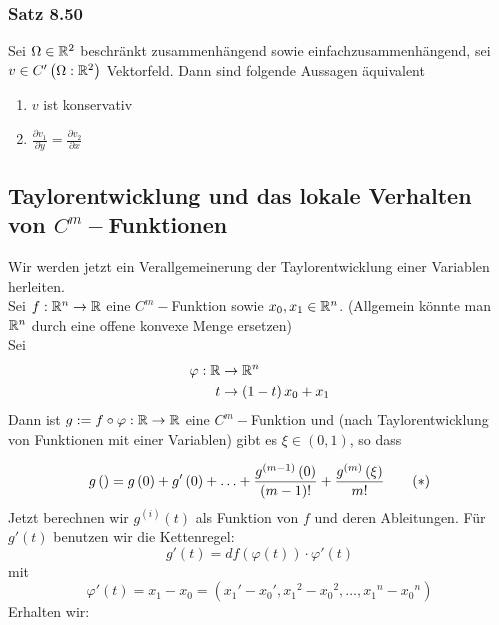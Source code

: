\subsubsection*{Satz 8.50}
Sei $\Omega\in\mathbb{R}^2$ beschränkt zusammenhängend sowie einfachzusammenhängend, sei $v\in C'\left( \Omega:\mathbb{R}^2\right)$ Vektorfeld. Dann sind folgende Aussagen äquivalent
\begin{enumerate}
\item $v$ ist konservativ
\item $\frac{\partial v_1}{\partial y}=\frac{\partial v_2}{\partial x}$
\end{enumerate}

\subsection*{Taylorentwicklung und das lokale Verhalten von $C^m-$Funktionen}
Wir werden jetzt ein Verallgemeinerung der Taylorentwicklung einer Variablen herleiten. \\

Sei $f:\mathbb{R}^n\to\mathbb{R}$ eine $C^m-$Funktion sowie $x_0,x_1\in\mathbb{R}^n$. (Allgemein könnte man $\mathbb{R}^n$ durch eine offene konvexe Menge ersetzen)\\

\noindent Sei
\begin{align*}
\varphi:\mathbb{R} &\to\mathbb{R}^n\\
t & \to \left( 1-t\right) x_0+x_1
\end{align*}
Dann ist $g:=f\circ\varphi:\mathbb{R}\to\mathbb{R}$ eine $C^m-$Funktion und (nach Taylorentwicklung  von Funktionen mit einer Variablen) gibt es $\xi\in (0,1)$, so dass

\[
g\left( {} \right) = g\left( 0 \right) + g'\left( 0 \right) +  \ldots  + \frac{{{g^{\left( {m - 1} \right)}}\left( 0 \right)}}{{\left( {m - 1} \right)!}} + \frac{{{g^{\left( m \right)}}\left( \xi  \right)}}{{m!}}\tag{\textasteriskcentered\label{Chap8Equation,Taylor}}
\]
Jetzt berechnen wir $g^{(i)}(t)$ als Funktion von $f$ und deren Ableitungen. Für $g'(t)$ benutzen wir die Kettenregel:
\[g'(t)=df\left( \varphi (t)\right) \cdot\varphi' (t)\] mit \[\varphi '(t) = {x_1} - {x_0} = \left( {{x_1}' - {x_0}',{x_1}^2 - {x_0}^2, \ldots ,{x_1}^n - {x_0}^n} \right)\] Erhalten wir:


